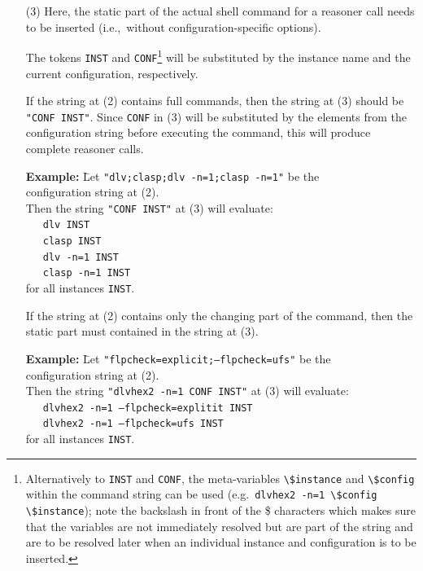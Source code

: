 \documentclass[a4paper]{article}
\begin{document}
\begin{enumerate}
		\item[(3)] Here, the static part of the actual shell command for a reasoner call needs to be inserted (i.e.,~without configuration-specific options).

			The tokens {\tt INST} and {\tt CONF}\footnote{
			Alternatively to {\tt INST} and {\tt CONF}, the meta-variables {\tt \textbackslash\$instance} and {\tt \textbackslash\$config}
			within the command string can be used (e.g.~{\tt dlvhex2 -n=1 \textbackslash\$config \textbackslash\$instance});
			note the backslash in front of the {\$} characters which makes sure that the variables are not immediately resolved but
			are part of the string and are to be resolved later when an individual instance and configuration is to be inserted.}
			will be substituted by the instance name and the current configuration, respectively.

			If the string at (2) contains full commands, then
			the string at (3) should be {\tt "CONF INST"}. Since {\tt CONF} in (3)
			will be substituted by the elements from the configuration string before executing the command, this will
			produce complete reasoner calls.

			\begin{tabbing}
				\textbf{Example: } \= Let {\tt "dlv;clasp;dlv -n=1;clasp -n=1"} be the \\
				\> configuration string at (2). \\
				\> Then the string {\tt "CONF INST"} at (3) will evaluate: \\
				\> \ \ \ {\tt dlv INST} \\
				\> \ \ \ {\tt clasp INST} \\
				\> \ \ \ {\tt dlv -n=1 INST} \\
				\> \ \ \ {\tt clasp -n=1 INST} \\
				\> for all instances {\tt INST}.
			\end{tabbing}

			If the string at (2) contains only the changing part of the command,
			then the static part must contained in the string at (3).

			\begin{tabbing}
				\textbf{Example: } \= Let {\tt "flpcheck=explicit;--flpcheck=ufs"} be the \\
				\> configuration string at (2). \\
				\> Then the string {\tt "dlvhex2 -n=1 CONF INST"} at (3) will evaluate: \\
				\> \ \ \ {\tt dlvhex2 -n=1 --flpcheck=explitit INST} \\
				\> \ \ \ {\tt dlvhex2 -n=1 --flpcheck=ufs INST} \\
				\> for all instances {\tt INST}.
			\end{tabbing}
		\end{enumerate}
		
\end{document}
